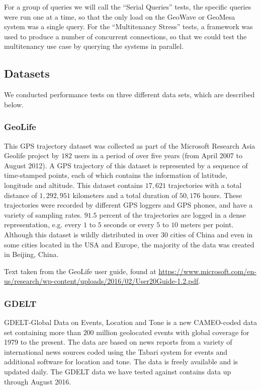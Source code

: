 For a group of queries we will call the ``Serial Queries'' tests, the specific queries were run one at a time, so that the only load on the GeoWave or GeoMesa system was a single query.
For the ``Multitenancy Stress'' tests, a framework was used to produce a number of concurrent connections, so that we could test the multitenancy use case by querying the systems in parallel.


\subsection{Datasets}
\label{sec:performance:datasets}

We conducted performance tests on three different data sets, which are described below.

\subsubsection{GeoLife}
\label{sec:performance:datasets:geolife}

This GPS trajectory dataset was collected as part of the Microsoft Research Asia Geolife project by $182$ users in a period of over five years (from April 2007 to August 2012).
A GPS trajectory of this dataset is represented by a sequence of time-stamped points, each of which contains the information of latitude, longitude and altitude.
This dataset contains $17,621$ trajectories with a total distance of $1,292,951$ kilometers and a total duration of $50,176$ hours.
These trajectories were recorded by different GPS loggers and GPS phones, and have a variety of sampling rates.
$91.5$ percent of the trajectories are logged in a dense representation, e.g. every $1$ to $5$ seconds or every $5$ to $10$ meters per point.
Although this dataset is wildly distributed in over $30$ cities of China and even in some cities located in the USA and Europe, the majority of the data was created in Beijing, China.

Text taken from the GeoLife user guide, found at \url{https://www.microsoft.com/en-us/research/wp-content/uploads/2016/02/User20Guide-1.2.pdf}.


\subsubsection{GDELT}
\label{sec:performance:datasets:gdelt}

GDELT-Global Data on Events, Location and Tone is a new CAMEO-coded data set containing more than $200$ million geolocated events with global coverage for 1979 to the present.
The data are based on news reports from a variety of international news sources coded using the Tabari system for events and additional software for location and tone.
The data is freely available and is updated daily.
The GDELT data we have tested against contains data up through August 2016.

